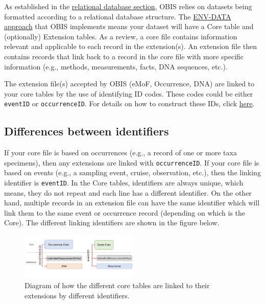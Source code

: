 \documentclass[
  letterpaper,
  DIV=11,
  numbers=noendperiod,
  oneside]{scrreprt}
\begin{document}
As established in the \href{relational_db.html}{relational database
section}, OBIS relies on datasets being formatted according to a
relational database structure. The
\protect\hyperlink{obis-holds-more-than-just-species-occurrences-the-env-data-approach}{ENV-DATA
approach} that OBIS implements means your dataset will have a Core table
and (optionally) Extension tables. As a review, a core file contains
information relevant and applicable to each record in the extension(s).
An extension file then contains records that link back to a record in
the core file with more specific information (e.g., methods,
measurements, facts, DNA sequences, etc.).

The extension file(s) accepted by OBIS (eMoF, Occurrence, DNA) are
linked to your core tables by the use of identifying ID codes. These
codes could be either \texttt{eventID} or \texttt{occurrenceID}. For
details on how to construct these IDs, click
\href{identifiers.html}{here}.

\hypertarget{differences-between-identifiers}{%
\subsection{Differences between
identifiers}\label{differences-between-identifiers}}

If your core file is based on occurrences (e.g., a record of one or more
taxa specimens), then any extensions are linked with
\texttt{occurrenceID}. If your core file is based on events (e.g., a
sampling event, cruise, observation, etc.), then the linking identifier
is \texttt{eventID}. In the Core tables, identifiers are always unique,
which means, they do not repeat and each line has a different
identifier. On the other hand, multiple records in an extension file can
have the same identifier which will link them to the same event or
occurrence record (depending on which is the Core). The different
linking identifiers are shown in the figure below.

\begin{figure}

{\centering \includegraphics[width=0.5\textwidth,height=\textheight]{images/coretable-identifiers.jpg}

}

\caption{Diagram of how the different core tables are linked to their
extensions by different identifiers.}

\end{figure}
\end{document}
